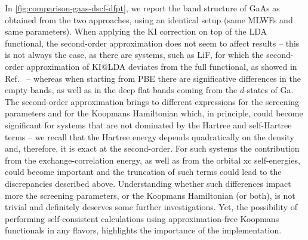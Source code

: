 In \cref{fig:comparison-gaas-dscf-dfpt}, we report the band structure of GaAs as obtained from the two approaches, using an identical setup (same MLWFs and same parameters). When applying the KI correction on top of the LDA functional, the second-order approximation does not seem to affect results -- this is not always the case, as there are systems, such as LiF, for which the second-order approximation of KI@LDA deviates from the full functional, as showed in Ref.~\cite{colonna_koopmans_2022} -- whereas when starting from PBE there are significative differences in the empty bands, as well as in the deep flat bands coming from the $d$-states of Ga. The second-order approximation brings to different expressions for the screening parameters and for the Koopmans Hamiltonian which, in principle, could become significant for systems that are not dominated by the Hartree and self-Hartree terms -- we recall that the Hartree energy depends quadratically on the density and, therefore, it is exact at the second-order. For such systems the contribution from the exchange-correlation energy, as well as from the orbital xc self-energies, could become important and the truncation of such terms could lead to the discrepancies described above. Understanding whether such differences impact more the screening parameters, or the Koopmans Hamiltonian (or both), is not trivial and definitely deserves some further investigations. Yet, the possibility of performing self-consistent calculations using approximation-free Koopmans functionals in any flavors, highlights the importance of the \kcp implementation.


